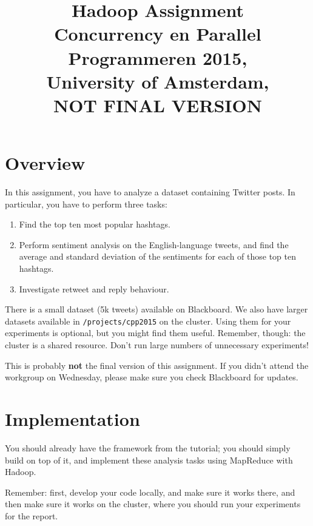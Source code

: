 \documentclass[a4paper,10pt]{article}
\date{}
\title{Hadoop Assignment\\
  Concurrency en Parallel Programmeren 2015,\\
  University of Amsterdam,\\
  NOT FINAL VERSION
}
\begin{document}
  \maketitle
  
  \tableofcontents
  
  \section{Overview}
  
  In this assignment, you have to analyze a dataset containing Twitter posts. In particular, you have to perform three tasks:

  \begin{enumerate}
    \item Find the top ten most popular hashtags.
    \item Perform sentiment analysis on the English-language tweets, and find the average and standard deviation of the sentiments for each of those top ten hashtags.
    \item Investigate retweet and reply behaviour.
  \end{enumerate}

  There is a small dataset (5k tweets) available on Blackboard. We also have larger datasets available in \texttt{/projects/cpp2015} on the cluster. Using them for your experiments is optional, but you might find them useful. Remember, though: the cluster is a shared resource. Don't run large numbers of unnecessary experiments!

  This is probably \textbf{not} the final version of this assignment. If you didn't attend the workgroup on Wednesday, please make sure you check Blackboard for updates.

  \section{Implementation}

  You should already have the framework from the tutorial; you should simply build on top of it, and implement these analysis tasks using MapReduce with Hadoop.
  
  Remember: first, develop your code locally, and make sure it works there, and then make sure it works on the cluster, where you should run your experiments
  for the report.
  
\end{document}
